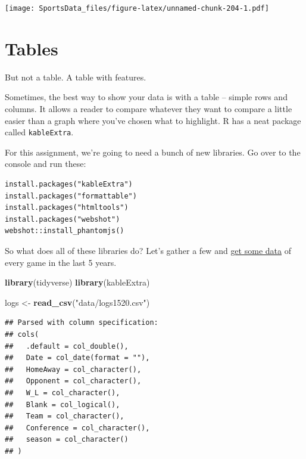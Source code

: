 \documentclass[
]{book}
\newenvironment{Shaded}{\begin{snugshade}}{\end{snugshade}}
\newcommand{\KeywordTok}[1]{\textcolor[rgb]{0.13,0.29,0.53}{\textbf{#1}}}
\newcommand{\NormalTok}[1]{#1}
\newcommand{\StringTok}[1]{\textcolor[rgb]{0.31,0.60,0.02}{#1}}
\begin{document}
\texttt{[image: SportsData\_files/figure-latex/unnamed-chunk-204-1.pdf]}

\hypertarget{tables}{%
\chapter{Tables}\label{tables}}

But not a table. A table with features.

Sometimes, the best way to show your data is with a table -- simple rows and columns. It allows a reader to compare whatever they want to compare a little easier than a graph where you've chosen what to highlight. R has a neat package called \texttt{kableExtra}.

For this assignment, we're going to need a bunch of new libraries. Go over to the console and run these:

\begin{verbatim}
install.packages("kableExtra")
install.packages("formattable")
install.packages("htmltools")
install.packages("webshot")
webshot::install_phantomjs()
\end{verbatim}

So what does all of these libraries do? Let's gather a few and \href{https://unl.box.com/s/th02njntiobd2azw7zhebgf9yb1o7x8i}{get some data} of every game in the last 5 years.

\begin{Shaded}
\begin{Highlighting}[]
\KeywordTok{library}\NormalTok{(tidyverse)}
\KeywordTok{library}\NormalTok{(kableExtra)}
\end{Highlighting}
\end{Shaded}

\begin{Shaded}
\begin{Highlighting}[]
\NormalTok{logs <-}\StringTok{ }\KeywordTok{read_csv}\NormalTok{(}\StringTok{"data/logs1520.csv"}\NormalTok{)}
\end{Highlighting}
\end{Shaded}

\begin{verbatim}
## Parsed with column specification:
## cols(
##   .default = col_double(),
##   Date = col_date(format = ""),
##   HomeAway = col_character(),
##   Opponent = col_character(),
##   W_L = col_character(),
##   Blank = col_logical(),
##   Team = col_character(),
##   Conference = col_character(),
##   season = col_character()
## )
\end{verbatim}
\end{document}
